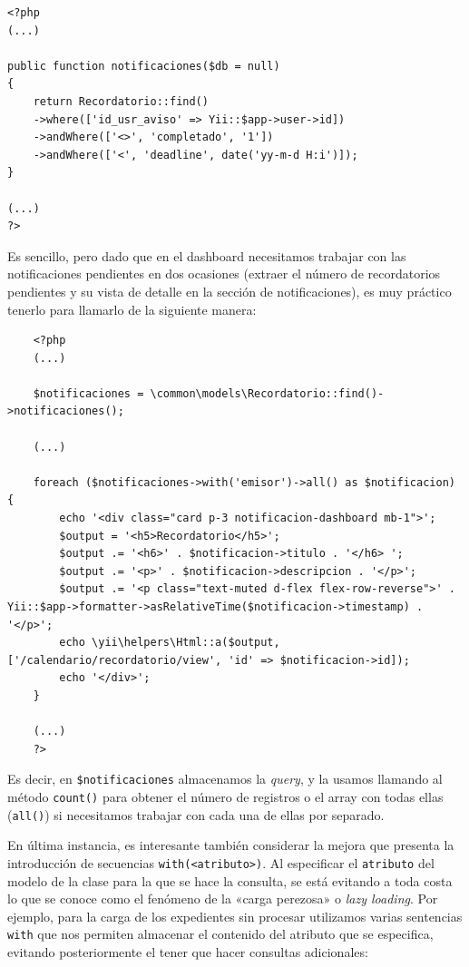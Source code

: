 \begin{verbatim}
<?php
(...)

public function notificaciones($db = null)
{
	return Recordatorio::find()
	->where(['id_usr_aviso' => Yii::$app->user->id])
	->andWhere(['<>', 'completado', '1'])
	->andWhere(['<', 'deadline', date('yy-m-d H:i')]);
}

(...)
?>
\end{verbatim}

Es sencillo, pero dado que en el dashboard necesitamos trabajar con las notificaciones pendientes en dos ocasiones (extraer el número de recordatorios pendientes y su vista de detalle en la sección de notificaciones), es muy práctico tenerlo para llamarlo de la siguiente manera:

\begin{verbatim}
	<?php
	(...)
	
	$notificaciones = \common\models\Recordatorio::find()->notificaciones();
	
	(...)
	
	foreach ($notificaciones->with('emisor')->all() as $notificacion) {
		echo '<div class="card p-3 notificacion-dashboard mb-1">';
		$output = '<h5>Recordatorio</h5>';
		$output .= '<h6>' . $notificacion->titulo . '</h6> ';
		$output .= '<p>' . $notificacion->descripcion . '</p>';
		$output .= '<p class="text-muted d-flex flex-row-reverse">' . Yii::$app->formatter->asRelativeTime($notificacion->timestamp) . '</p>';
		echo \yii\helpers\Html::a($output, ['/calendario/recordatorio/view', 'id' => $notificacion->id]);
		echo '</div>';
	}
	
	(...)
	?>
\end{verbatim}

Es decir, en \texttt{\$notificaciones} almacenamos la \textit{query}, y la usamos llamando al método \texttt{count()} para obtener el número de registros o el array con todas ellas (\texttt{all()}) si necesitamos trabajar con cada una de ellas por separado.

En última instancia, es interesante también considerar la mejora que presenta la introducción de secuencias \texttt{with(<atributo>)}. Al especificar el \texttt{atributo} del modelo de la clase para la que se hace la consulta, se está evitando a toda costa lo que se conoce como el fenómeno de la «carga perezosa» o \textit{lazy loading}. Por ejemplo, para la carga de los expedientes sin procesar utilizamos varias sentencias \texttt{with} que nos permiten almacenar el contenido del atributo que se especifica, evitando posteriormente el tener que hacer consultas adicionales:

